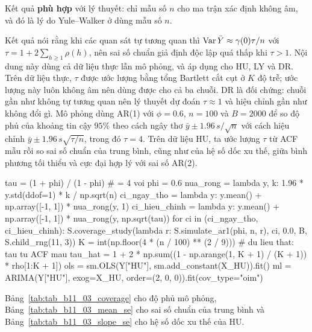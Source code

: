  Kết quả \textbf{phù hợp} với lý thuyết: chỉ mẫu số $n$ cho ma trận xác định không âm, và đó là lý do Yule--Walker ở  dùng mẫu số $n$.

 Kết quả  nói rằng khi các quan sát tự tương quan thì $\operatorname{Var}\bar Y\approx\gamma(0)\tau/n$ với $\tau=1+2\sum_{h\ge1}\rho(h)$, nên sai số chuẩn giả định độc lập quá thấp khi $\tau>1$.
 Nội dung này dùng cả dữ liệu thực lẫn mô phỏng, và áp dụng cho HU, LY và DR. Trên dữ liệu thực, $\tau$ được ước lượng bằng tổng Bartlett cắt cụt ở $K$ độ trễ; ước lượng này luôn không âm nên dùng được cho cả ba chuỗi. DR là đối chứng: chuỗi gần như không tự tương quan nên lý thuyết dự đoán $\tau\approx1$ và hiệu chỉnh gần như không đổi gì. Mô phỏng dùng AR(1) với $\phi=0.6$, $n=100$ và $B=2000$ để so độ phủ của khoảng tin cậy $95\%$ theo cách ngây thơ $\bar y\pm1.96\,s/\sqrt n$ với cách hiệu chỉnh $\bar y\pm1.96\,s\sqrt{\tau/n}$, trong đó $\tau=4$. Trên dữ liệu HU, ta ước lượng $\tau$ từ ACF mẫu rồi so sai số chuẩn của trung bình, cũng như của hệ số dốc xu thế, giữa bình phương tối thiểu và cực đại hợp lý với sai số AR(2).
\begin{codeblock}
tau = (1 + phi) / (1 - phi)                                    # = 4 voi phi = 0.6
nua_rong = lambda y, k: 1.96 * y.std(ddof=1) * k / np.sqrt(n)
ci_ngay_tho = lambda y: y.mean() + np.array([-1, 1]) * nua_rong(y, 1)
ci_hieu_chinh = lambda y: y.mean() + np.array([-1, 1]) * nua_rong(y, np.sqrt(tau))
for ci in (ci_ngay_tho, ci_hieu_chinh):
    S.coverage_study(lambda r: S.simulate_ar1(phi, n, r), ci, 0.0, B, S.child_rng(11, 3))
K = int(np.floor(4 * (n / 100) ** (2 / 9)))                    # du lieu that: tau tu ACF mau
tau_hat = 1 + 2 * np.sum((1 - np.arange(1, K + 1) / (K + 1)) * rho[1:K + 1])
ols = sm.OLS(Y["HU"], sm.add_constant(X_HU)).fit()
ml = ARIMA(Y["HU"], exog=X_HU, order=(2, 0, 0)).fit(cov_type="oim")
\end{codeblock}
 Bảng~\ref{tab:tab_b11_03_coverage} cho độ phủ mô phỏng, Bảng~\ref{tab:tab_b11_03_mean_se} cho sai số chuẩn của trung bình và Bảng~\ref{tab:tab_b11_03_slope_se} cho hệ số dốc xu thế của HU.
